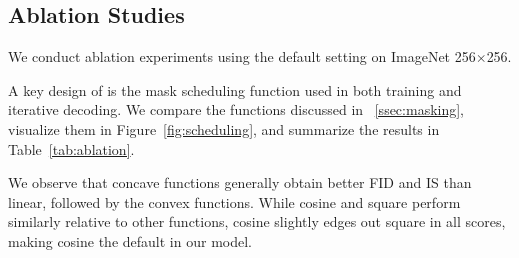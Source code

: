 \subsection{Ablation Studies}
\setlength{\tabcolsep}{5pt}
\begin{table}[!t]
\small
    \centering
    {\small
    }
    \vspace{-.1cm}
    \caption{\textbf{Ablation results on the mask scheduling functions.} We report the best FID, IS, and Negative Log-Likelihood loss for each candidate scheduling function. }
    \label{tab:ablation}
\vspace{-3mm}
\end{table}
\label{ssec:ablation}
We conduct ablation experiments using the default setting on ImageNet 256$\times$256.

A key design of \model is the mask scheduling function used in both training and iterative decoding. We compare the functions discussed in ~\ref{ssec:masking}, visualize them in Figure~\ref{fig:scheduling}, and summarize the results in Table~\ref{tab:ablation}.

We observe that concave functions generally obtain better FID and IS than linear, followed by the convex functions. While cosine and square perform similarly relative to other functions, cosine slightly edges out square in all scores, making cosine the default in our model.

